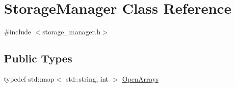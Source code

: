 \hypertarget{classStorageManager}{}\section{Storage\+Manager Class Reference}
\label{classStorageManager}


{\ttfamily \#include $<$storage\+\_\+manager.\+h$>$}

\subsection*{Public Types}
\begin{DoxyCompactItemize}
\item 
typedef std\+::map$<$ std\+::string, int $>$ \hyperlink{classStorageManager_a029dfd29d09cbf61ea0c7151526d3924}{Open\+Arrays}
\end{DoxyCompactItemize}
